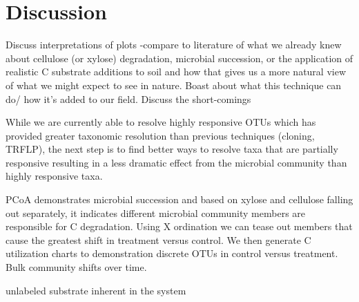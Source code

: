 \section{Discussion}
Discuss interpretations of plots
    -compare to literature of what we already knew about cellulose (or xylose) degradation, microbial succession, or the application of realistic C substrate additions to soil and how that gives us a more natural view of what we might expect to see in nature.  
Boast about what this technique can do/ how it's added to our field.
Discuss the short-comings


While we are currently able to resolve highly responsive OTUs which has provided greater taxonomic resolution than previous techniques (cloning, TRFLP), the next step is to find better ways to resolve taxa that are partially responsive resulting in a less dramatic effect from the microbial community than highly responsive taxa.  

PCoA demonstrates microbial succession and based on xylose and cellulose falling out separately, it indicates different microbial community members are responsible for C degradation.  Using X ordination we can tease out members that cause the greatest shift in treatment versus control.  We then generate C utilization charts to demonstration discrete OTUs in control versus treatment.  Bulk community shifts over time. 

unlabeled substrate inherent in the system

